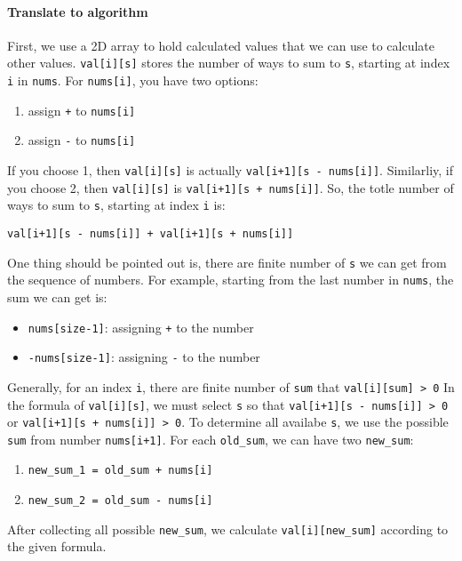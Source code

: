 \documentclass[11pt]{article}
\begin{document}
\paragraph{Translate to algorithm}
\label{sec:orgc6b7257}

First, we use a 2D array to hold calculated values that we can use to calculate other values. \texttt{val[i][s]} stores the number of ways to sum to \texttt{s}, starting at index \texttt{i} in \texttt{nums}. For \texttt{nums[i]}, you have two options:
\begin{enumerate}
\item assign \texttt{+} to \texttt{nums[i]}
\item assign \texttt{-} to \texttt{nums[i]}
\end{enumerate}
If you choose 1, then \texttt{val[i][s]} is actually \texttt{val[i+1][s - nums[i]]}. Similarliy, if you choose 2, then \texttt{val[i][s]} is \texttt{val[i+1][s + nums[i]]}. So, the totle number of ways to sum to \texttt{s}, starting at index \texttt{i} is:
\begin{Verbatim}[frame=single]
val[i+1][s - nums[i]] + val[i+1][s + nums[i]]
\end{Verbatim}

One thing should be pointed out is, there are finite number of \texttt{s} we can get from the sequence of numbers. For example, starting from the last number in \texttt{nums}, the sum we can get is:
\begin{itemize}
\item \texttt{nums[size-1]}: assigning \texttt{+} to the number
\item \texttt{-nums[size-1]}: assigning \texttt{-} to the number
\end{itemize}
Generally, for an index \texttt{i}, there are finite number of \texttt{sum} that \texttt{val[i][sum] > 0}  In the formula of \texttt{val[i][s]}, we must select \texttt{s} so that \texttt{val[i+1][s - nums[i]] > 0} or \texttt{val[i+1][s + nums[i]] > 0}. To determine all availabe \texttt{s}, we use the possible \texttt{sum} from number \texttt{nums[i+1]}. For each \texttt{old\_sum}, we can have two \texttt{new\_sum}:
\begin{enumerate}
\item \texttt{new\_sum\_1 = old\_sum + nums[i]}
\item \texttt{new\_sum\_2 = old\_sum - nums[i]}
\end{enumerate}

After collecting all possible \texttt{new\_sum}, we calculate \texttt{val[i][new\_sum]} according to the given formula.
\end{document}
